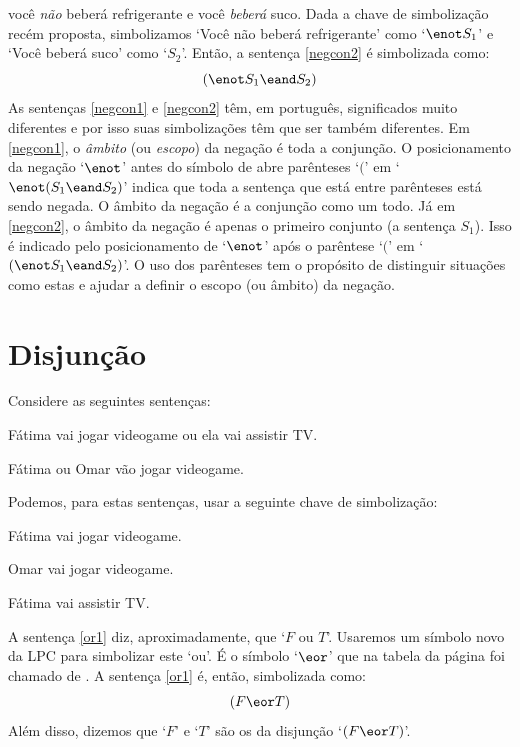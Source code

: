 você \emph{não} beberá refrigerante e você \emph{beberá} suco.
Dada a chave de simbolização recém proposta, simbolizamos `Você não beberá refrigerante' como `$\enot S_1$' e `Você beberá suco' como `$S_2$'.
Então, a sentença \ref{negcon2} é simbolizada como:
$$(\enot S_1 \eand S_2)$$
As sentenças \ref{negcon1} e \ref{negcon2} têm, em português, significados muito diferentes e por isso suas simbolizações têm que ser também diferentes.
Em \ref{negcon1}, o \emph{âmbito} (ou \emph{escopo}) da negação é toda a conjunção.
O posicionamento da negação `$\enot$' antes do símbolo de abre parênteses `$($'  em `$\enot(S_1 \eand S_2)$' indica que toda a sentença que está entre parênteses está sendo negada. O âmbito da negação é a conjunção como um todo.
Já em \ref{negcon2}, o âmbito da negação é apenas o primeiro conjunto (a sentença $S_1$).
Isso é indicado pelo posicionamento de `$\enot$' após o parêntese `$($' em `$(\enot S_1 \eand S_2)$'.
O uso dos parênteses tem o propósito de distinguir situações como estas e ajudar a definir o escopo (ou âmbito) da negação.


\section{Disjunção}
\label{s:ConnectiveDisjunction}

Considere as seguintes sentenças:
	\begin{earg}
		\item[\ex{or1}]Fátima vai jogar videogame ou ela vai assistir TV.
		\item[\ex{or2}]Fátima ou Omar vão jogar videogame. 
	\end{earg}
Podemos, para estas sentenças, usar a seguinte chave de simbolização:
	\begin{ekey}
		\item[F] Fátima vai jogar videogame.
		\item[O] Omar vai jogar videogame.
		\item[T] Fátima vai assistir TV.
	\end{ekey}
A sentença \ref{or1} diz, aproximadamente, que `$F$ ou $T$'.
Usaremos um símbolo novo da LPC para simbolizar este `ou'.
É o símbolo `$\eor$' que na tabela da página \pageref{table:TFLConnectives} foi chamado de . 
A sentença \ref{or1} é, então, simbolizada como:
$$(F \eor T)$$
Além disso, dizemos que `$F$' e `$T$' são os  da disjunção `$(F \eor T)$'.

